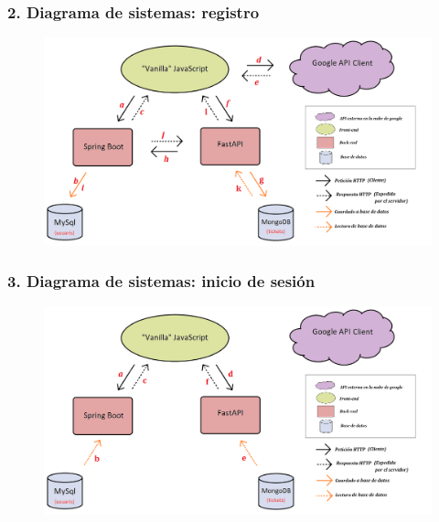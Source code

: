 \documentclass{beamer}
\begin{document}
			
			\begin{frame}
				\frametitle{2. Diagrama de sistemas: registro}
				
				\begin{figure}
					\centering
					\includegraphics[width=1\linewidth]{../img/diagramaSistemesAplicacioMercappCAMIREGISTREbo}
					
					\label{fig:diagramasistemesaplicaciomercappcamiregistrebo}
				\end{figure}
				
			\end{frame}
			
			
			\begin{frame}
				\frametitle{3. Diagrama de sistemas: inicio de sesión}
				
				\begin{figure}
					\centering
					\includegraphics[width=1\linewidth]{../img/diagramaSistemesAplicacioMercappCAMIINICISESSIO}
					
					\label{fig:diagramasistemesaplicaciomercappcamiinicisessio}
				\end{figure}
				
			\end{frame}
			
\end{document}
